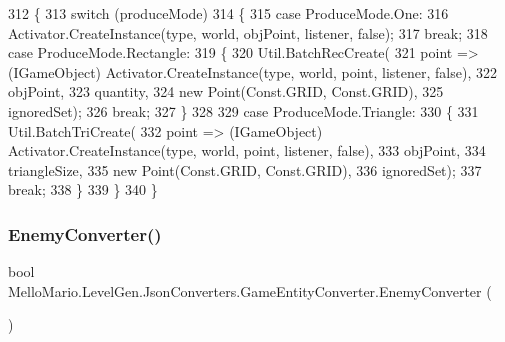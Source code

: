 \begin{DoxyCode}
312         \{
313             \textcolor{keywordflow}{switch} (produceMode)
314             \{
315                 \textcolor{keywordflow}{case} ProduceMode.One:
316                     Activator.CreateInstance(type, world, objPoint, listener, \textcolor{keyword}{false});
317                     \textcolor{keywordflow}{break};
318                 \textcolor{keywordflow}{case} ProduceMode.Rectangle:
319                 \{
320                     Util.BatchRecCreate(
321                         point => (IGameObject) Activator.CreateInstance(type, 
      world, point, listener, \textcolor{keyword}{false}),
322                         objPoint,
323                         quantity,
324                         \textcolor{keyword}{new} Point(Const.GRID, Const.GRID),
325                         ignoredSet);
326                     \textcolor{keywordflow}{break};
327                 \}
328 
329                 \textcolor{keywordflow}{case} ProduceMode.Triangle:
330                 \{
331                     Util.BatchTriCreate(
332                         point => (IGameObject) Activator.CreateInstance(type, 
      world, point, listener, \textcolor{keyword}{false}),
333                         objPoint,
334                         triangleSize,
335                         \textcolor{keyword}{new} Point(Const.GRID, Const.GRID),
336                         ignoredSet);
337                     \textcolor{keywordflow}{break};
338                 \}
339             \}
340         \}
\end{DoxyCode}
\mbox{\label{classMelloMario_1_1LevelGen_1_1JsonConverters_1_1GameEntityConverter_a6b8c73a03eb4abbb992924809bf45610}} 
\subsubsection{Enemy\+Converter()}
{\footnotesize\ttfamily bool Mello\+Mario.\+Level\+Gen.\+Json\+Converters.\+Game\+Entity\+Converter.\+Enemy\+Converter (\begin{DoxyParamCaption}{ }\end{DoxyParamCaption})\hspace{0.3cm}{\ttfamily [private]}}



